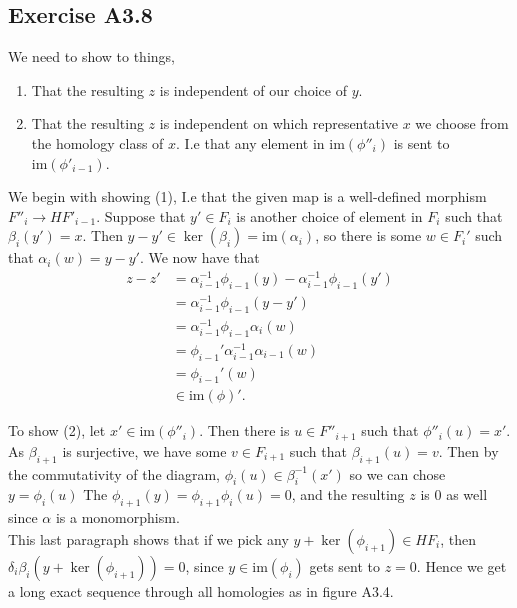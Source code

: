 \documentclass{article}
\theoremstyle{definition}
\newcommand{\im}{\text{im}}
\begin{document}
\subsection*{Exercise A3.8}

We need to show to things,
\begin{enumerate}
	\item That the resulting $z$ is independent of our choice of $y$.
	\item That the resulting $z$ is independent on which representative $x$ we
		choose from the homology class of $x$. I.e that any element in
		$\im(\phi''_i)$ is sent to $\im(\phi'_{i-1})$.
\end{enumerate}

We begin with showing (1), I.e that the given map is a well-defined morphism
$F''_i \to HF'_{i-1}$. Suppose that $y' \in F_i$ is another choice of element
in $F_i$ such that $\beta_i(y') = x$. Then $y - y' \in \ker(\beta_i) =
\im(\alpha_i)$, so there is some $w \in F_i'$ such that $\alpha_i(w) = y - y'$.
We now have that 
\begin{align*}
	z - z'
	&=
	\alpha_{i-1}^{-1}\phi_{i-1}(y)
	-
	\alpha_{i-1}^{-1}\phi_{i-1}(y') \\
	&=
	\alpha_{i-1}^{-1}\phi_{i-1}(y - y') \\
	&=
	\alpha_{i-1}^{-1}\phi_{i-1}\alpha_i(w) \\
	&=
	\phi_{i-1}'\alpha_{i-1}^{-1}\alpha_{i-1}(w) \\
	&=
	\phi_{i-1}'(w) \\
	&\in 
	\im(\phi)'.
\end{align*}

To show (2), let $x' \in \im(\phi''_i)$. Then there is $u \in F''_{i + 1}$ such
that $\phi''_i(u) = x'$. As $\beta_{i + 1}$ is surjective, we have some $v \in
F_{i + 1}$ such that $\beta_{i + 1}(u) = v$. Then by the commutativity of the
diagram, $\phi_{i}(u) \in \beta_i^{-1}(x')$ so we can chose $y = \phi_i(u)$ The
$\phi_{i+1}(y) = \phi_{i+1}\phi_i(u) = 0$, and the resulting $z$ is $0$ as well
since $\alpha$ is a monomorphism. \\

This last paragraph shows that if we pick any $y + \ker(\phi_{i + 1}) \in H
F_i$, then $\delta_i \beta_i (y + \ker(\phi_{i + 1})) = 0$, since $y \in
\im(\phi_i)$ gets sent to $z = 0$. Hence we get a long exact sequence through
all homologies as in figure A3.4.
\end{document}

